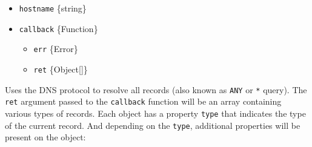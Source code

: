 \begin{itemize}
\tightlist
\item
  \texttt{hostname} \{string\}
\item
  \texttt{callback} \{Function\}

  \begin{itemize}
  \tightlist
  \item
    \texttt{err} \{Error\}
  \item
    \texttt{ret} \{Object{[}{]}\}
  \end{itemize}
\end{itemize}

Uses the DNS protocol to resolve all records (also known as \texttt{ANY}
or \texttt{*} query). The \texttt{ret} argument passed to the
\texttt{callback} function will be an array containing various types of
records. Each object has a property \texttt{type} that indicates the
type of the current record. And depending on the \texttt{type},
additional properties will be present on the object:

